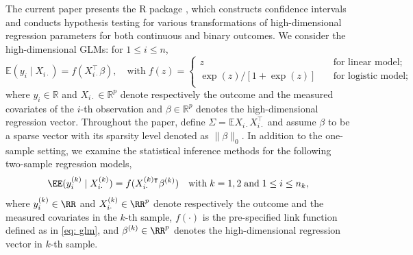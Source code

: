 The current paper presents the R package , which constructs confidence intervals and conducts hypothesis testing for various transformations of high-dimensional regression parameters for both continuous and binary outcomes. We consider the high-dimensional GLMs: for $1\leq i\leq n$,
\begin{equation}
    \mathbb{E}(y_i \mid X_{i\cdot}) = f(X_{i\cdot}^\intercal \beta),\quad \textrm{with}\;
    f(z) = \begin{cases}
        z & \quad \textrm{for linear model;}\\
        \exp{(z)} / \left[1 + \exp{(z)} \right] & \quad \textrm{for logistic model;} \\
    \end{cases}
    \label{eq: glm}
\end{equation}
where $y_i \in \mathbb{R}$ and $X_{i\cdot} \in \mathbb{R}^p$ denote respectively the outcome and the measured covariates of the $i$-th observation and $\beta \in \mathbb{R}^p$ denotes the high-dimensional regression vector. Throughout the paper, define $\Sigma = \mathbb{E}X_{i\cdot} X_{i\cdot}^\intercal$ and assume $\beta$ to be a sparse vector with its sparsity level denoted as $\|\beta\|_0$. In addition to the one-sample setting, we examine the statistical inference methods for the following two-sample regression models, %
\begin{equation}
    \EE(y_i^{(k)} \mid X_{i\cdot}^{(k)}) = f(X_{i\cdot}^{(k)\intercal} \beta^{(k)}) \quad \textrm{with}\; k=1,2 \; \textrm{and}\; 1\leq i\leq n_k,
    \label{eq: two sample glm}
\end{equation}
where $y_i^{(k)} \in \RR$ and $X_{i\cdot}^{(k)} \in \RR^p$ denote respectively the outcome and the measured covariates in the $k$-th sample, $f(\cdot)$ is the pre-specified link function defined as in \eqref{eq: glm}, and $\beta^{(k)} \in \RR^p$ denotes the high-dimensional regression vector in $k$-th sample.

